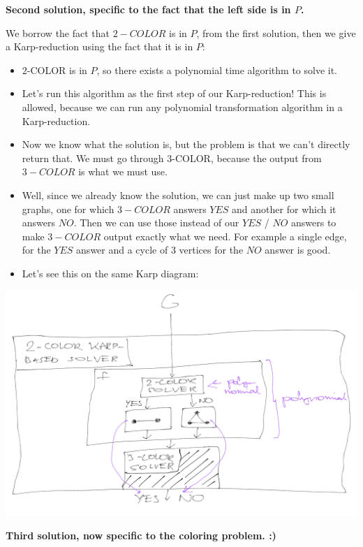 \separate

\textbf{Second solution, specific to the fact that the left side is in $P$.}

We borrow the fact that $2-COLOR$ is in $P$, from the first solution, then we give a Karp-reduction using the fact that it is in $P$:

\begin{itemize}
    \item $2$-COLOR is in $P$, so there exists a polynomial time algorithm to solve it.
    \item Let's run this algorithm as the first step of our Karp-reduction! This is allowed, because we can run any polynomial transformation algorithm in a Karp-reduction.
    \item Now we know what the solution is, but the problem is that we can't directly return that. We must go through 3-COLOR, because the output from $3-COLOR$ is what we must use.
    \item Well, since we already know the solution, we can just make up two small graphs, one for which $3-COLOR$ answers $YES$ and another for which it answers $NO$. Then we can use those instead of our $YES$ / $NO$ answers to make $3-COLOR$ output exactly what we need. For example a single edge, for the $YES$ answer and a cycle of $3$ vertices for the $NO$ answer is good.
    \item Let's see this on the same Karp diagram:
\end{itemize}

\begin{center}
\includegraphics[width=0.8\linewidth]{./08/01/2color_3color_karp.png}
\end{center}

\separate

\textbf{Third solution, now specific to the coloring problem. :)}

